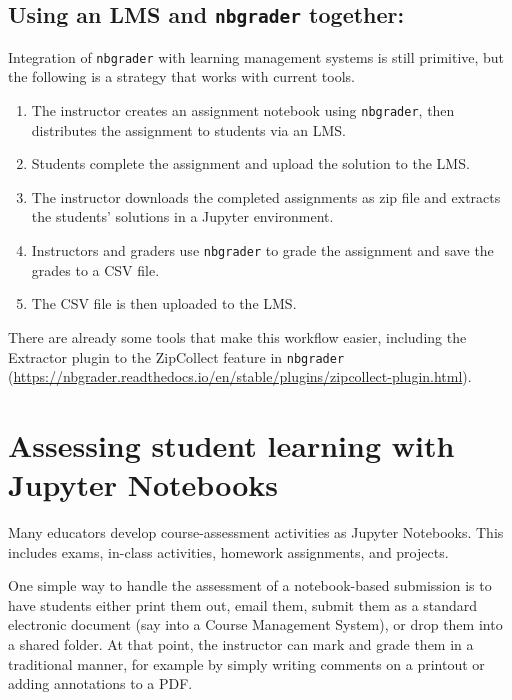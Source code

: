 \documentclass[]{book}
\begin{document}
\subsection{\texorpdfstring{Using an LMS and \texttt{nbgrader}
together:}{Using an LMS and nbgrader together:}}\label{using-an-lms-and-nbgrader-together}

Integration of \texttt{nbgrader} with learning management systems is
still primitive, but the following is a strategy that works with current
tools.

\begin{enumerate}
\def\labelenumi{\arabic{enumi}.}
\item
  The instructor creates an assignment notebook using \texttt{nbgrader},
  then distributes the assignment to students via an LMS.
\item
  Students complete the assignment and upload the solution to the LMS.
\item
  The instructor downloads the completed assignments as zip file and
  extracts the students' solutions in a Jupyter environment.
\item
  Instructors and graders use \texttt{nbgrader} to grade the assignment
  and save the grades to a CSV file.
\item
  The CSV file is then uploaded to the LMS.
\end{enumerate}

There are already some tools that make this workflow easier, including
the Extractor plugin to the ZipCollect feature in \texttt{nbgrader}
(\url{https://nbgrader.readthedocs.io/en/stable/plugins/zipcollect-plugin.html}).

\section{Assessing student learning with Jupyter
Notebooks}\label{assessing-student-learning-with-jupyter-notebooks}

Many educators develop course-assessment activities as Jupyter
Notebooks. This includes exams, in-class activities, homework
assignments, and projects.

One simple way to handle the assessment of a notebook-based submission
is to have students either print them out, email them, submit them as a
standard electronic document (say into a Course Management System), or
drop them into a shared folder. At that point, the instructor can mark
and grade them in a traditional manner, for example by simply writing
comments on a printout or adding annotations to a PDF.
\end{document}
